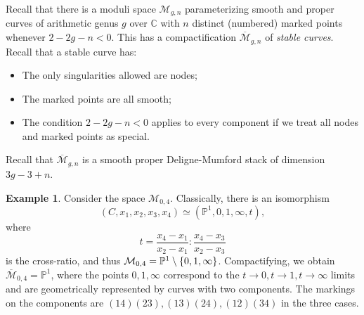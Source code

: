 \documentclass[leqno, openany]{memoir}
\theoremstyle{definition}
\newtheorem{exm}[thm]{Example}
\theoremstyle{remark}
\theoremstyle{plain}
\theoremstyle{definition}
\theoremstyle{remark}
\newcommand{\C}{\mathbb{C}}
\renewcommand{\P}{\mathbb{P}}
\newcommand{\mc}[1]{\mathcal{#1}}
\newcommand{\ol}[1]{\overline{#1}}
\begin{document}
Recall that there is a moduli space $\mc{M}_{g,n}$ parameterizing smooth and proper curves of arithmetic genus $g$ over $\C$ with $n$ distinct (numbered) marked points whenever $2-2g-n < 0$. This has a compactification $\ol{\mc{M}}_{g,n}$ of \textit{stable curves}. Recall that a stable curve has:
\begin{itemize}
\item The only singularities allowed are nodes;
\item The marked points are all smooth;
\item The condition $2-2g-n < 0$ applies to every component if we treat all nodes and marked points as special.
\end{itemize}
Recall that $\ol{\mc{M}}_{g,n}$ is a smooth proper Deligne-Mumford stack of dimension $3g-3+n$.

\begin{exm}
  Consider the space $\mc{M}_{0,4}$. Classically, there is an isomorphism
  \[ (C,x_1,x_2,x_3,x_4) \simeq (\P^1, 0, 1, \infty, t), \]
  where
  \[ t = \frac{x_4-x_1}{x_2-x_1} : \frac{x_4-x_3}{x_2-x_3} \]
  is the cross-ratio, and thus $\mc{M}_{0,4} = \P^1 \setminus \qty{0,1,\infty}$. Compactifying, we obtain $\ol{\mc{M}}_{0,4} = \P^1$, where the points $0,1,\infty$ correspond to the $t \to 0, t \to 1, t \to \infty$ limits and are geometrically represented by curves with two components. The markings on the components are $(14)(23), (13)(24), (12)(34)$ in the three cases.
\end{exm}
\end{document}
